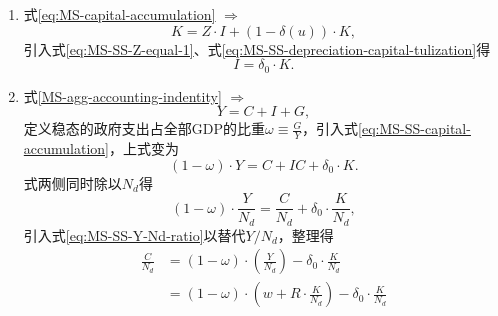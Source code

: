 \begin{enumerate}
\item 式\eqref{eq:MS-capital-accumulation} $\Rightarrow$
\begin{equation*}
K = Z \cdot I + (1-\delta(u)) \cdot K,
\end{equation*}
引入式\eqref{eq:MS-SS-Z-equal-1}、式\eqref{eq:MS-SS-depreciation-capital-tulization}得
\begin{equation}
\label{eq:MS-SS-capital-accumulation}
I = \delta_0 \cdot K.
\end{equation}

\item 式\eqref{MS-agg-accounting-indentity} $\Rightarrow$
\begin{equation*}
Y = C + I + G,
\end{equation*}
定义稳态的政府支出占全部GDP的比重$\omega \equiv \frac{G}{Y}$，引入式\eqref{eq:MS-SS-capital-accumulation}，上式变为
\begin{equation*}
\left( 1 - \omega \right) \cdot Y = C + I  C + \delta_0 \cdot K.
\end{equation*}
式两侧同时除以$N_{d}$得
\begin{equation*}
\left(1 - \omega \right) \cdot \frac{Y}{N_d}  = \frac{C}{N_{d}} + \delta_0 \cdot \frac{K}{N_{d}},
\end{equation*}
引入式\eqref{eq:MS-SS-Y-Nd-ratio}以替代$Y/N_d$，整理得
\begin{equation}
\label{eq:MS-SS-C-Nd-ratio}
\begin{split}
\frac{C}{N_d} &= \left( 1 - \omega \right) \cdot \left( \frac{Y}{N_d}\right) - \delta_0 \cdot \frac{K}{N_d} \\
&= \left( 1 - \omega \right) \cdot \left( w + R \cdot \frac{K}{N_d}\right) - \delta_0 \cdot \frac{K}{N_d}
\end{split}
\end{equation}


\end{enumerate}

